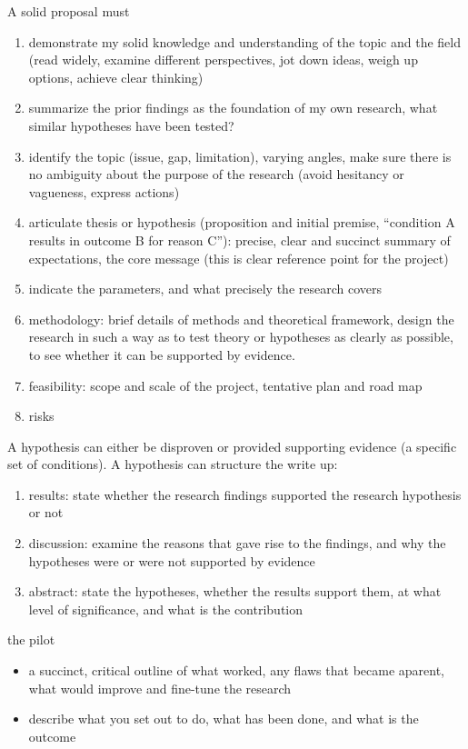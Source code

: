 \documentclass[10pt,a4paper,twocolumn]{article}
\begin{document}
A solid proposal must
\begin{enumerate}
  \item demonstrate my solid knowledge and understanding of the topic and the field (read
  widely, examine different perspectives, jot down ideas, weigh up options, achieve clear
  thinking)
  \item summarize the prior findings as the foundation of my own research, what similar
  hypotheses have been tested?
  \item identify the topic (issue, gap, limitation), varying angles, make sure there is
  no ambiguity about the purpose of the research (avoid hesitancy or vagueness, express
  actions)
  \item articulate thesis or hypothesis (proposition and initial premise, ``condition A
  results in outcome B for reason C''): precise, clear and succinct summary of expectations,
  the core message (this is clear reference point for the project)
  \item indicate the parameters, and what precisely the research covers
  \item methodology: brief details of methods and theoretical framework, design the research
  in such a way as to test theory or hypotheses as clearly as possible, to see whether it can
  be supported by evidence.
  \item feasibility: scope and scale of the project, tentative plan and road map
  \item risks
\end{enumerate}

A hypothesis can either be disproven or provided supporting evidence (a specific set of
conditions). A hypothesis can structure the write up:
\begin{enumerate}
  \item results: state whether the research findings supported the research hypothesis or not
  \item discussion: examine the reasons that gave rise to the findings, and why the hypotheses
  were or were not supported by evidence
  \item abstract: state the hypotheses, whether the results support them, at what level
  of significance, and what is the contribution
\end{enumerate}

the pilot
\begin{itemize}
  \item a succinct, critical outline of what worked, any flaws that became aparent, what
  would improve and fine-tune the research
  \item describe what you set out to do, what has been done, and what is the outcome
\end{itemize}
\end{document}

